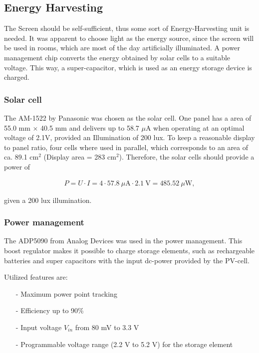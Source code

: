 \subsection{Energy Harvesting}
The Screen should be self-sufficient, thus some sort of Energy-Harvesting unit is needed.
It was apparent to choose light as the energy source, since the screen will be used in rooms, which are most of the day artificially illuminated.
A power management chip converts the energy  obtained by solar cells to a suitable voltage.
This way, a super-capacitor, which is used as an energy storage device is charged.

\subsubsection{Solar cell}
The AM-1522 by Panasonic was chosen as the solar cell.
One panel has a area of 55.0 mm $\times$ 40.5 mm and delivers up to 58.7 $\mu\text{A}$ when operating at an optimal voltage of 2.1V, provided an Illumination of 200 lux.
To keep a reasonable display to panel ratio, four cells where used in parallel, which corresponds to an area of ca. 89.1 cm$^2$ (Display area = 283 cm$^2$). Therefore, the solar cells should provide a power of

\begin{align}
	P = U\cdot I = 4\cdot 57.8\ \mu\text{A}\cdot 2.1\ \text{V}=485.52\ \mu \text{W},\label{development:cell_power}
\end{align}

given a 200 lux illumination. \cite{amorton}

\subsubsection{Power management}
The ADP5090 from Analog Devices was used in the power management.
This boost regulator makes it possible to charge storage elements, such as rechargeable batteries and super capacitors with the input dc-power provided by the PV-cell.

Utilized features are:
\begin{itemize}
	\item[-] Maximum power point tracking
	\item[-] Efficiency up to 90\%
	\item[-] Input voltage $V_{in}$ from 80 mV to 3.3 V
	\item[-] Programmable voltage range (2.2 V to 5.2 V) for the storage element
\end{itemize}

